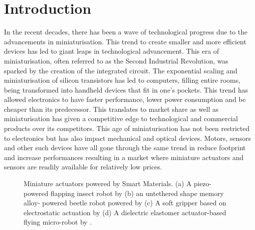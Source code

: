 
\cleardoublepage
\chapter*{Introduction}
In the recent decades, there has been a wave of technological progress due to the advancements in miniaturisation. This trend to create smaller and more efficient devices has led to giant leaps in technological advancement. This era of miniaturisation, often referred to as the Second Industrial Revolution, was sparked by the creation of the integrated circuit. The exponential scaling and miniaturisation of silicon transistors has led to computers, filling entire rooms, being transformed into handheld devices that fit in one's pockets. This trend has allowed electronics to have faster performance, lower power consumption and be cheaper than its predecessor. This translates to market share as well as miniaturisation has given a competitive edge to technological and commercial products over its competitors. This age of miniaturisation has not been restricted to electronics but has also impact mechanical and optical devices. Motors, sensors and other such devices have all gone through the same trend in reduce footprint and increase performances resulting in a market where miniature actuators and sensors are readily available for relatively low prices.

\begin{figure}[hbt!]
    \centering
    \resizebox{0.8\textwidth}{!}{}
    \caption{Miniature actuators powered by Smart Materials. (a) A piezo-powered flapping insect robot by \cite{sreetharanMonolithicFabricationMillimeterscale2012} (b) an untethered shape memory alloy- powered beetle robot powered by \cite{yang88milligramInsectscaleAutonomous2020a} (c) A soft gripper based on electrostatic actuation by \cite{shintakeVersatileSoftGrippers2016} (d) A dielectric elastomer actuator-based flying micro-robot by \cite{chenControlledFlightMicrorobot2019}.}
    \label{fig:smart-actuator-examples}
\end{figure}

